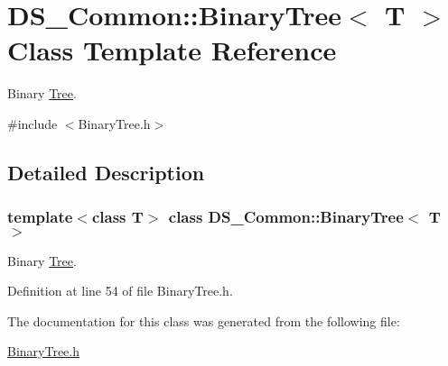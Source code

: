 \hypertarget{class_d_s___common_1_1_binary_tree_3_01_t_01_4}{}\section{D\+S\+\_\+\+Common\+:\+:Binary\+Tree$<$ T $>$ Class Template Reference}
\label{class_d_s___common_1_1_binary_tree_3_01_t_01_4}


Binary \mbox{\hyperlink{class_tree}{Tree}}.  




{\ttfamily \#include $<$Binary\+Tree.\+h$>$}



\subsection{Detailed Description}
\subsubsection*{template$<$class T$>$\newline
class D\+S\+\_\+\+Common\+::\+Binary\+Tree$<$ T $>$}

Binary \mbox{\hyperlink{class_tree}{Tree}}. 

Definition at line 54 of file Binary\+Tree.\+h.



The documentation for this class was generated from the following file\+:\begin{DoxyCompactItemize}
\item 
\mbox{\hyperlink{_binary_tree_8h}{Binary\+Tree.\+h}}\end{DoxyCompactItemize}
